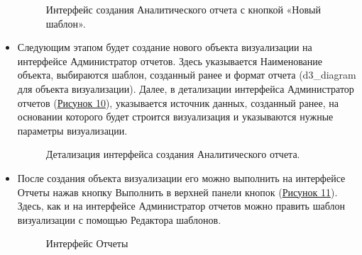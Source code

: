 \documentclass[a4paper]{extarticle}
\begin{document}
\begin{itemize}
\begin{figure}[H]
\caption{Интерфейс создания Аналитического отчета с кнопкой «Новый шаблон».}
\label{ris4_1}
\end{figure}\par
    \item Следующим этапом будет создание нового объекта визуализации на интерфейсе Администратор отчетов. Здесь указывается Наименование объекта, выбираются шаблон, созданный ранее и формат отчета (d3\_diagram для объекта визуализации). Далее, в детализации интерфейса Администратор отчетов (\hyperref[ris4_2]{Рисунок 10}), указывается источник данных, созданный ранее, на основании которого будет строится визуализация и указываются нужные параметры визуализации.
\begin{figure}[H]
\caption{Детализация интерфейса создания Аналитического отчета.}
\label{ris4_2}
\end{figure}\par
    \item После создания объекта визуализации его можно выполнить на интерфейсе Отчеты нажав кнопку Выполнить в верхней панели кнопок (\hyperref[ris6]{Рисунок 11}). Здесь, как и на интерфейсе Администратор отчетов можно править шаблон визуализации с помощью Редактора шаблонов.
\begin{figure}[H]
\caption{Интерфейс Отчеты}
\label{ris6}
\end{figure}\par
\end{itemize}\par
\end{document}
